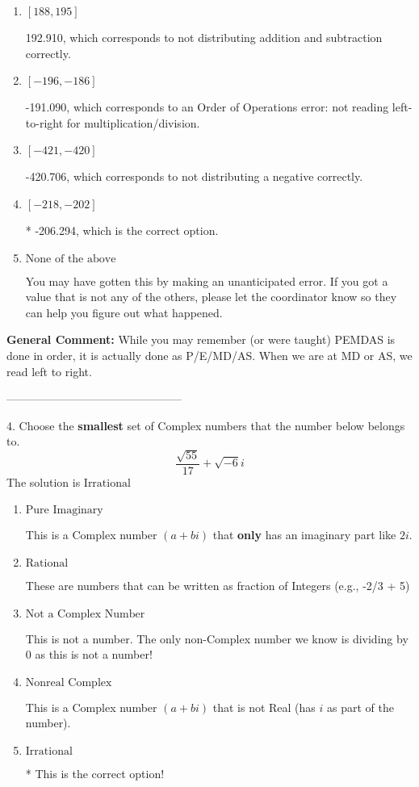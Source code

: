 \documentclass{extbook}[14pt]
\begin{document}
\begin{enumerate}[label=\Alph*.] 
\item $ [188, 195] $ 

  192.910, which corresponds to not distributing addition and subtraction correctly. 
\item $ [-196, -186] $ 

  -191.090, which corresponds to an Order of Operations error: not reading left-to-right for multiplication/division. 
\item $ [-421, -420] $ 

  -420.706, which corresponds to not distributing a negative correctly. 
\item $ [-218, -202] $ 

 * -206.294, which is the correct option. 
\item $ \text{None of the above} $ 

  You may have gotten this by making an unanticipated error. If you got a value that is not any of the others, please let the coordinator know so they can help you figure out what happened. 
\end{enumerate} 
 
\textbf{General Comment:} While you may remember (or were taught) PEMDAS is done in order, it is actually done as P/E/MD/AS. When we are at MD or AS, we read left to right. 

-----------------------------------------------

4. Choose the \textbf{smallest} set of Complex numbers that the number below belongs to.
\[ \frac{\sqrt{55}}{17}+\sqrt{-6}i \] 
The solution is $ \text{Irrational} $ 

\begin{enumerate}[label=\Alph*.] 
\item $ \text{Pure Imaginary} $ 

 This is a Complex number $(a+bi)$ that \textbf{only} has an imaginary part like $2i$. 
\item $ \text{Rational} $ 

 These are numbers that can be written as fraction of Integers (e.g., -2/3 + 5) 
\item $ \text{Not a Complex Number} $ 

 This is not a number. The only non-Complex number we know is dividing by 0 as this is not a number! 
\item $ \text{Nonreal Complex} $ 

 This is a Complex number $(a+bi)$ that is not Real (has $i$ as part of the number). 
\item $ \text{Irrational} $ 

 * This is the correct option! 
\end{enumerate} 
 
\end{document}
